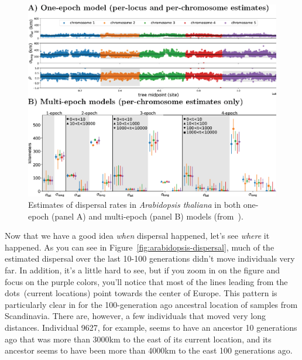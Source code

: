 \begin{figure}
  \begin{center}
    \includegraphics[width=14cm]{arabidopsis-epochs.eps}
  \end{center}
  \caption{Estimates of dispersal rates in {\it Arabidopsis
      thaliana\/} in both one-epoch (panel A) and multi-epoch (panel
    B) models (from~\cite{Osmond-Coop-2021}).}\label{fig:arabidopsis-epochs}
\end{figure}

Now that we have a good idea {\it when\/} dispersal happened, let's
see {\it where\/} it happened. As you can see in
Figure~\ref{fig:arabidopsis-dispersal}, much of the estimated
dispersal over the last 10-100 generations didn't move individuals
very far. In addition, it's a little hard to see, but if you zoom in
on the figure and focus on the purple colors, you'll notice that most
of the lines leading from the dots~(current locations) point towards
the center of Europe. This pattern is particularly clear in for the
100-generation ago ancestral location of samples from
Scandinavia. There are, however, a few individuals that moved very
long distances. Individual 9627, for example, seems to have an ancestor 10
generations ago that was more than 3000km to the east of its current
location, and its ancestor seems to have been more than 4000km to the
east 100 generations ago.

